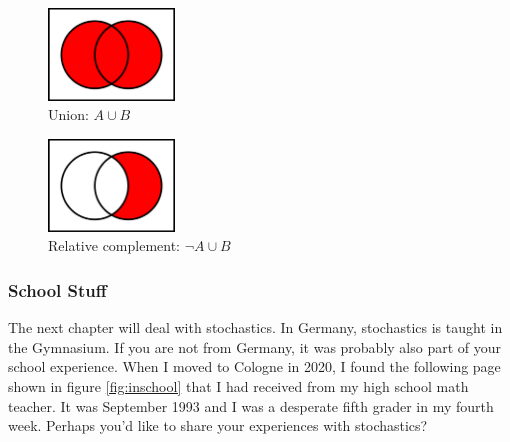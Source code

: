 \documentclass[
  12pt,
  oneside]{book}
\theoremstyle{definition}
\theoremstyle{definition}
\theoremstyle{definition}
\theoremstyle{definition}
\theoremstyle{remark}
\begin{document}
\begin{figure}
\centering
\includegraphics[width=0.3\textwidth,height=\textheight]{fig/union.png}
\caption{\label{fig:bfig} Union: \(A \cup B\)}
\end{figure}

\begin{figure}
\centering
\includegraphics[width=0.3\textwidth,height=\textheight]{fig/notA.png}
\caption{\label{fig:cfig} Relative complement: \(\neg A \cup B\)}
\end{figure}

\subsubsection*{School Stuff}\label{school-stuff}

The next chapter will deal with stochastics. In Germany, stochastics is taught in the Gymnasium. If you are not from Germany, it was probably also part of your school experience. When I moved to Cologne in 2020, I found the following page shown in figure \ref{fig:inschool} that I had received from my high school math teacher. It was September 1993 and I was a desperate fifth grader in my fourth week. Perhaps you'd like to share your experiences with stochastics?
\end{document}
